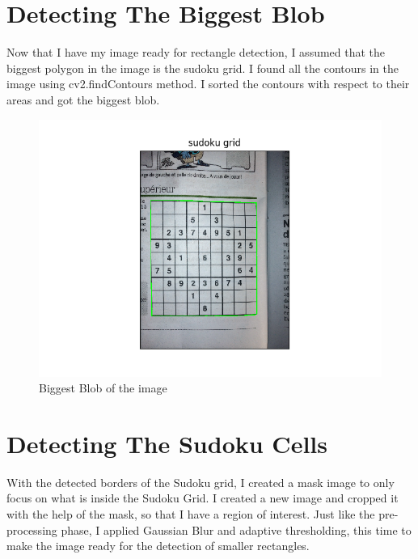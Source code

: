 \section*{Detecting The Biggest Blob}

Now that I have my image ready for rectangle detection, I assumed that the biggest polygon in the image is the sudoku grid. I found all the contours in the image using cv2.findContours method. I sorted the contours with respect to their areas and got the biggest blob.

\begin{figure}[H]
    \centering
    \includegraphics[width=\textwidth]{images/extracted_grid.png}
    \caption{Biggest Blob of the image}
    \setlength{\belowcaptionskip}{-20pt}
    \setlength{\abovecaptionskip}{-20pt}
\end{figure}

\section*{Detecting The Sudoku Cells}

With the detected borders of the Sudoku grid, I created a mask image to only focus on what is inside the Sudoku Grid. I created a new image and cropped it with the help of the mask, so that I have a region of interest. Just like the pre-processing phase, I applied Gaussian Blur and adaptive thresholding, this time to make the image ready for the detection of smaller rectangles.

